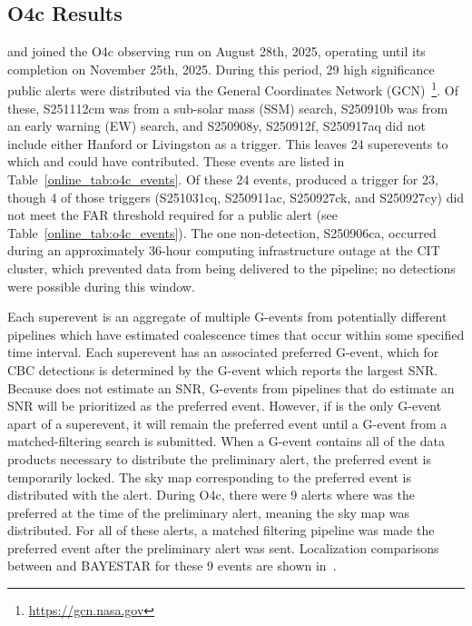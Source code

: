 \begin{refsection}
\section{O4c Results} \label{online_sec:o4c}
\aframe and \amplfi joined the O4c observing run on August 28th, 2025, operating until its completion on November 25th, 2025. 
During this period, 29 high significance public alerts were distributed via the General Coordinates Network (GCN)~\footnote{\url{https://gcn.nasa.gov}}.
Of these, S251112cm was from a sub-solar mass (SSM) search, S250910b was from an early warning (EW) search, and S250908y, S250912f, S250917aq did not include either Hanford or Livingston as a trigger. 
This leaves 24 superevents to which \aframe and \amplfi could have contributed. 
These events are listed in Table~\ref{online_tab:o4c_events}. 
Of these 24 events, \aframe produced a trigger for 23, though 4 of those triggers (S251031cq, S250911ac, S250927ck, and S250927cy) did not meet the FAR threshold required for a public alert (see Table~\ref{online_tab:o4c_events}).
The one non-detection, S250906ca, occurred during an approximately 36-hour computing infrastructure outage at the CIT cluster, which prevented data from being delivered to the pipeline; no detections were possible during this window.

Each superevent is an aggregate of multiple G-events from potentially different pipelines which have estimated coalescence times that occur within some specified time interval. 
Each superevent has an associated preferred G-event, which for CBC detections is determined by the G-event which reports the largest SNR. 
Because \aframe does not estimate an SNR, G-events from pipelines that do estimate an SNR will be prioritized as the preferred event. 
However, if \aframe is the only G-event apart of a superevent, it will remain the preferred event until a G-event from a matched-filtering search is submitted. 
When a G-event contains all of the data products necessary to distribute the preliminary alert, the preferred event is temporarily locked. 
The sky map corresponding to the preferred event is distributed with the alert. 
During O4c, there were 9 alerts where \aframe was the preferred at the time of the preliminary alert, meaning the \amplfi sky map was distributed. 
For all of these alerts, a matched filtering pipeline was made the preferred event after the preliminary alert was sent. 
Localization comparisons between \amplfi and BAYESTAR for these 9 events are shown in~.


\end{refsection}

